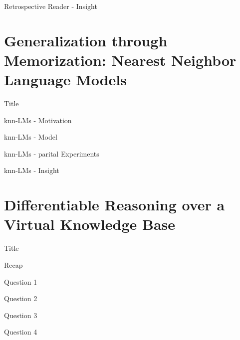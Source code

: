 \documentclass[10pt]{beamer}
\begin{document}
\begin{frame}{Retrospective Reader - Insight}

\end{frame}

\section{Generalization through Memorization: Nearest Neighbor Language Models}

\begin{frame}{Title}
    
\end{frame}

\begin{frame}{knn-LMs - Motivation}

\end{frame}

\begin{frame}{knn-LMs - Model}

\end{frame}

\begin{frame}{knn-LMs - parital Experiments}

\end{frame}

\begin{frame}{knn-LMs - Insight}

\end{frame}

\section{Differentiable Reasoning over a Virtual Knowledge Base}

\begin{frame}{Title}
    
\end{frame}

\begin{frame}{Recap}
    
\end{frame}

\begin{frame}{Question 1}

\end{frame}

\begin{frame}{Question 2}

\end{frame}

\begin{frame}{Question 3}

\end{frame}

\begin{frame}{Question 4}

\end{frame}
\end{document}
